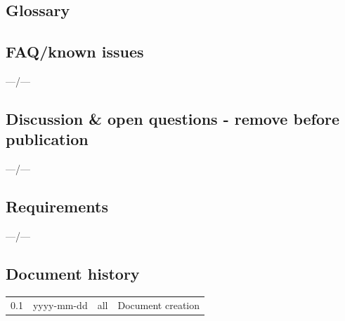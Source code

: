 \documentclass[a4paper,10pt,bibtotoc]{scrartcl}
\begin{document}
\subsection{Glossary}
\label{sec:glossary}



\subsection{FAQ/known issues}

---/---

\subsection{Discussion \& open questions - remove before publication}
---/---

\subsection{Requirements}

---/---


\subsection{Document history}

\begin{center}
  \tablelasttail{\hline}
  \begin{supertabular}{lllp{10cm}}
    0.1 & yyyy-mm-dd & all & Document creation \\
  \end{supertabular}
\end{center}

\end{document}
